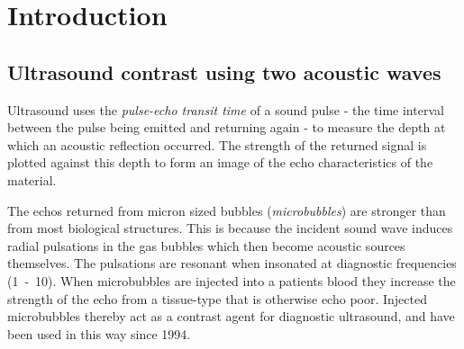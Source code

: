 



\chapter{Introduction}\label{ch:introduction}
\section{Ultrasound contrast using two acoustic waves}\label{sec:int:Introduction}

 

 

Ultrasound uses the {\em pulse-echo transit time} of a sound pulse -
the time interval between the pulse being emitted and returning again -
to measure the depth at which an acoustic reflection occurred.
The strength of the returned signal is plotted
against this depth to form an image of the echo characteristics of the material.



The echos returned from micron sized bubbles ({\em microbubbles}) are stronger than from most biological structures.
This is because the incident sound wave induces radial pulsations in the gas bubbles
which then become acoustic sources themselves.
The pulsations are resonant when insonated at diagnostic frequencies (\unit{1-10}\mega\hertz).
When microbubbles are injected into a patients blood
they increase the strength of the echo
from a tissue-type that is otherwise echo poor.
Injected microbubbles thereby act as a contrast agent for diagnostic ultrasound,
and have been used in this way since 1994\cite{NYtimesAlbunex}.


